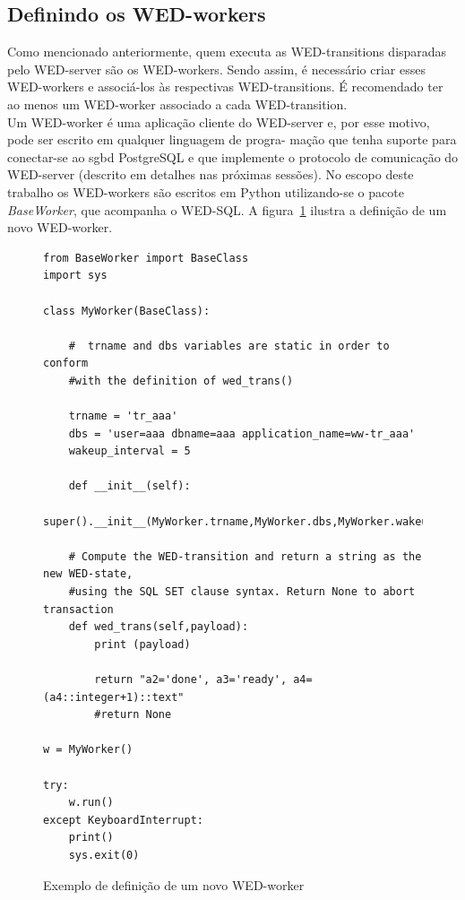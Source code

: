 \documentclass[conference]{IEEEtran}
\begin{document}
\subsection{Definindo os WED-workers}
Como mencionado anteriormente, quem executa as WED-transitions disparadas pelo WED-server são os WED-workers. Sendo assim,
é necessário criar esses WED-workers e associá-los às respectivas WED-transitions. É recomendado ter ao menos um WED-worker
associado a cada WED-transition.
\\
\indent Um WED-worker é uma aplicação cliente do WED-server e, por esse motivo, pode ser escrito em qualquer linguagem de progra-
mação que tenha suporte para conectar-se ao sgbd PostgreSQL e que implemente o protocolo de comunicação do WED-server (descrito
em detalhes nas próximas sessões). No escopo deste trabalho os WED-workers são escritos em Python utilizando-se o pacote \emph{BaseWorker}, 
que acompanha o WED-SQL. A figura~\ref{fig_ww} ilustra a definição de um novo WED-worker.

\begin{figure}[!t]
\begin{Verbatim}[fontsize=\tiny]
from BaseWorker import BaseClass
import sys

class MyWorker(BaseClass):
    
    #  trname and dbs variables are static in order to conform 
    #with the definition of wed_trans()
        
    trname = 'tr_aaa'
    dbs = 'user=aaa dbname=aaa application_name=ww-tr_aaa'
    wakeup_interval = 5
    
    def __init__(self):
        super().__init__(MyWorker.trname,MyWorker.dbs,MyWorker.wakeup_interval)
    
    # Compute the WED-transition and return a string as the new WED-state, 
    #using the SQL SET clause syntax. Return None to abort transaction
    def wed_trans(self,payload):
        print (payload)
        
        return "a2='done', a3='ready', a4=(a4::integer+1)::text"
        #return None
        
w = MyWorker()

try:
    w.run()
except KeyboardInterrupt:
    print()
    sys.exit(0)
\end{Verbatim}
\caption{Exemplo de definição de um novo WED-worker}
\label{fig_ww}
\end{figure}
\end{document}
